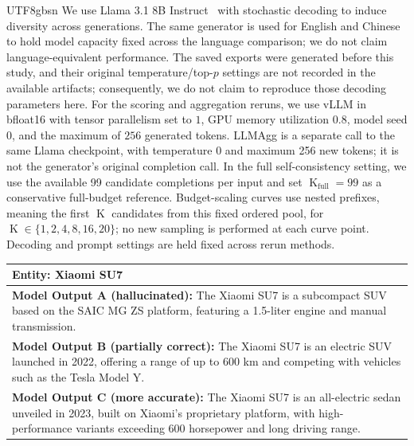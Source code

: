 \documentclass[11pt]{article}
\begin{document}
\begin{CJK*}{UTF8}{gbsn}
We use Llama 3.1 8B Instruct~\citep{llama3} with stochastic decoding to induce diversity across generations. The same generator is used for English and Chinese to hold model capacity fixed across the language comparison; we do not claim language-equivalent performance. The saved exports were generated before this study, and their original temperature/top-$p$ settings are not recorded in the available artifacts; consequently, we do not claim to reproduce those decoding parameters here. For the scoring and aggregation reruns, we use vLLM in bfloat16 with tensor parallelism set to $1$, GPU memory utilization $0.8$, model seed $0$, and the maximum of $256$ generated tokens. LLMAgg is a separate call to the same Llama checkpoint, with temperature 0 and maximum 256 new tokens; it is not the generator's original completion call. In the full self-consistency setting, we use the available 99 candidate completions per input and set $\operatorname{K}_{\text{full}}=99$ as a conservative full-budget reference. Budget-scaling curves use nested prefixes, meaning the first $\operatorname{K}$ candidates from this fixed ordered pool, for $\operatorname{K}\!\in\!\{1,2,4,8,16,20\}$; no new sampling is performed at each curve point. Decoding and prompt settings are held fixed across rerun methods.


\begin{table}
\small
\centering
\begin{tabular}{p{}}
\toprule
\textbf{Entity:} Xiaomi SU7 \\
\midrule

\textbf{Model Output A (hallucinated):}
The Xiaomi SU7 is a subcompact SUV based on the SAIC MG ZS platform,
featuring a 1.5-liter engine and manual transmission. \\

\textbf{Model Output B (partially correct):}
The Xiaomi SU7 is an electric SUV launched in 2022, offering a range
of up to 600 km and competing with vehicles such as the Tesla Model Y. \\

\textbf{Model Output C (more accurate):}
The Xiaomi SU7 is an all-electric sedan unveiled in 2023, built on
Xiaomi's proprietary platform, with high-performance variants exceeding
600 horsepower and long driving range. \\

\midrule


\end{tabular}
\end{table}
\end{CJK*}
\end{document}
